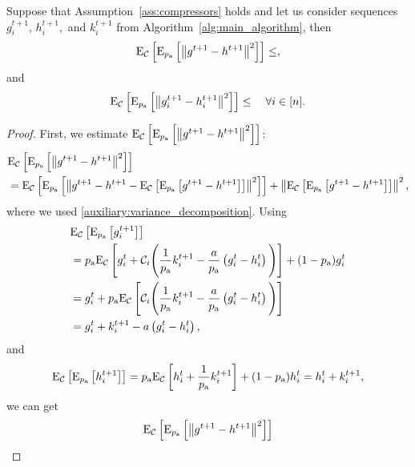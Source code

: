 \documentclass{article}
\begin{document}
\begin{lemma}
  Suppose that Assumption~\ref{ass:compressors} holds and let us consider sequences $g^{t+1}_i$, $h^{t+1}_i,$ and $k^{t+1}_i$ from Algorithm~\ref{alg:main_algorithm}, then
  \begin{align}
      \label{eq:compressor_global_error}
      {\rm E}_{\mathcal{C}}\left[{\rm E}_{p_{\textnormal{a}}}\left[\left\| g^{t+1} - h^{t+1} \right\|^2\right]\right]
      \leq ,
  \end{align}
  and
  \begin{align}
      \label{eq:compressor_local_error}
      {\rm E}_{\mathcal{C}}\left[{\rm E}_{p_{\textnormal{a}}}\left[\left\| g^{t+1}_i - h^{t+1}_i \right\|^2\right]\right] \leq \quad \forall i \in [n].
  \end{align}
\end{lemma}
\begin{proof}
  First, we estimate ${\rm E}_{\mathcal{C}}\left[{\rm E}_{p_{\textnormal{a}}}\left[\left\| g^{t+1} - h^{t+1} \right\|^2\right]\right]$:
  \begin{align*}
      &{\rm E}_{\mathcal{C}}\left[{\rm E}_{p_{\textnormal{a}}}\left[\left\| g^{t+1} - h^{t+1} \right\|^2\right]\right] \\
      &={\rm E}_{\mathcal{C}}\left[{\rm E}_{p_{\textnormal{a}}}\left[\left\| g^{t+1} - h^{t+1} - {\rm E}_{\mathcal{C}}\left[{\rm E}_{p_{\textnormal{a}}}\left[g^{t+1} - h^{t+1}\right]\right] \right\|^2\right]\right] + \left\| {\rm E}_{\mathcal{C}}\left[{\rm E}_{p_{\textnormal{a}}}\left[g^{t+1} - h^{t+1}\right]\right] \right\|^2,
  \end{align*}
  where we used \eqref{auxiliary:variance_decomposition}.
  Using
  \begin{align*}
      &{\rm E}_{\mathcal{C}}\left[{\rm E}_{p_{\textnormal{a}}}\left[g^{t+1}_i\right]\right] \\
      &=p_{\textnormal{a}} {\rm E}_{\mathcal{C}}\left[g^{t}_i + \mathcal{C}_i\Bigg(\frac{1}{p_{\textnormal{a}}}k^{t+1}_i - \frac{a}{p_{\textnormal{a}}} \left(g^{t}_i - h^{t}_i\right)\Bigg)\right] + (1 - p_{\textnormal{a}}) g^{t}_i \\
      &=g^{t}_i  + p_{\textnormal{a}}{\rm E}_{\mathcal{C}}\left[\mathcal{C}_i\Bigg(\frac{1}{p_{\textnormal{a}}}k^{t+1}_i - \frac{a}{p_{\textnormal{a}}} \left(g^{t}_i - h^{t}_i\right)\Bigg)\right] \\
      &=g^{t}_i  + k^{t+1}_i - a \left(g^{t}_i - h^{t}_i\right), \\
  \end{align*}
  and 
  \begin{align*}
      &{\rm E}_{\mathcal{C}}\left[{\rm E}_{p_{\textnormal{a}}}\left[h^{t+1}_i\right]\right] = p_{\textnormal{a}} {\rm E}_{\mathcal{C}}\left[h^t_i + \frac{1}{p_{\textnormal{a}}}k^{t+1}_i\right] + (1 - p_{\textnormal{a}}) h^{t}_i = h^{t}_i + k^{t+1}_i, \\
  \end{align*}
  we can get
  \begin{align*}
      &\ExpSub{\cC}{\ExpSub{\probavailable}{\norm{g^{t+1} - h^{t+1}}^2}} \\

\end{align*}
\end{proof}
\end{document}
